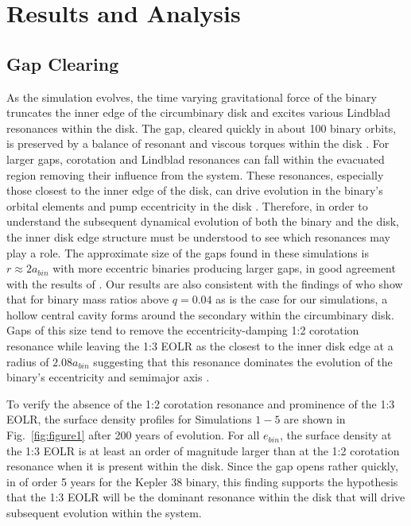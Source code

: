 \section{Results and Analysis}


\subsection{Gap Clearing} \label{GapClearing}

As the simulation evolves, the time varying gravitational force of the
binary truncates the inner edge of the circumbinary disk and excites
various Lindblad resonances within the disk.  The gap, cleared quickly
in about 100 binary orbits, is preserved by a balance of resonant and
viscous torques within the disk \citep{Arty94}.  For larger gaps,
corotation and Lindblad resonances can fall within the evacuated
region removing their influence from the system.  These resonances,
especially those closest to the inner edge of the disk, can drive
evolution in the binary's orbital elements \citep{Goldreich1980,Artymowicz1991} and
pump eccentricity in the disk \citep{Papaloizou01}.  Therefore, in
order to understand the subsequent dynamical evolution of both the
binary and the disk, the inner disk edge structure must be understood to see which
resonances may play a role.  The approximate size of the gaps found in
these simulations is $r \approx 2 a_{bin}$ with more eccentric binaries
producing larger gaps, in good agreement with the results of
\citet{Arty94}.  Our results are also consistent with the findings of \citet{DOrazio2016} who show that for binary mass ratios above $q = 0.04$ as is the case 
for our simulations, a hollow central cavity forms around the secondary within the circumbinary disk.  Gaps of this size tend to remove the eccentricity-damping 
1:2 corotation resonance while leaving the 1:3 EOLR as the closest to the inner disk edge at a radius of $2.08 a_{bin}$ suggesting that this resonance 
dominates the evolution of the binary's eccentricity and semimajor axis \citep{Artymowicz1991,Artymowicz1992,Papaloizou01}.

To verify the absence of the 1:2 corotation resonance and prominence
of the 1:3 EOLR, the surface density profiles for Simulations $1-5$
are shown in Fig.~\ref{fig:figure1} after 200 years of evolution.
For all $e_{bin}$, the surface density at the 1:3 EOLR is at least an
order of magnitude larger than at the 1:2 corotation resonance when it
is present within the disk.  Since the gap opens rather quickly, in of order 5 years for the Kepler 38 binary,  this finding supports the hypothesis that the 1:3 EOLR will be the dominant resonance within the disk that will drive subsequent evolution within the system.

